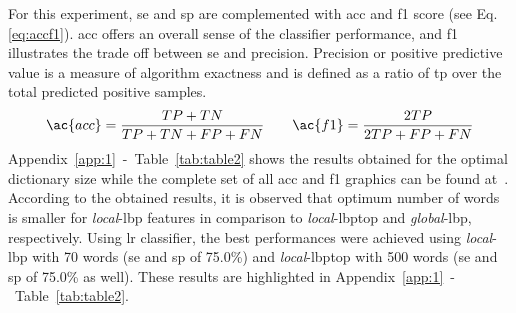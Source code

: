 For this experiment, \ac{se} and \ac{sp} are complemented with \ac{acc} and \ac{f1} score (see Eq.\,\eqref{eq:accf1}).
\ac{acc} offers an overall sense of the classifier performance, and \ac{f1} illustrates the trade off between \ac{se} and precision.
Precision or positive predictive value is a measure of algorithm exactness and is defined as a ratio of \ac{tp} over the total predicted positive samples.
\begin{align}
\ac{acc} = \frac{TP+TN}{TP+TN+FP+FN} \qquad \ac{f1} = \frac{2TP}{2TP +FP+FN}
\label{eq:accf1}
\end{align}
Appendix~\ref{app:1}~-~Table~\ref{tab:table2} shows the results obtained for the optimal dictionary size while the complete set of all \ac{acc} and \ac{f1} graphics can be found at~\cite{Lemaitre2015}.
According to the obtained results, it is observed that optimum number of words is smaller for \emph{local}-\ac{lbp} features in comparison to \emph{local}-\ac{lbptop} and \emph{global}-\ac{lbp}, respectively.
Using \ac{lr} classifier, the best performances were achieved using \emph{local}-\ac{lbp} with 70 words (\ac{se} and \ac{sp} of 75.0\%) and \emph{local}-\ac{lbptop} with 500 words (\ac{se} and \ac{sp} of 75.0\% as well).
These results are highlighted in Appendix~\ref{app:1}~-~Table~\ref{tab:table2}.







